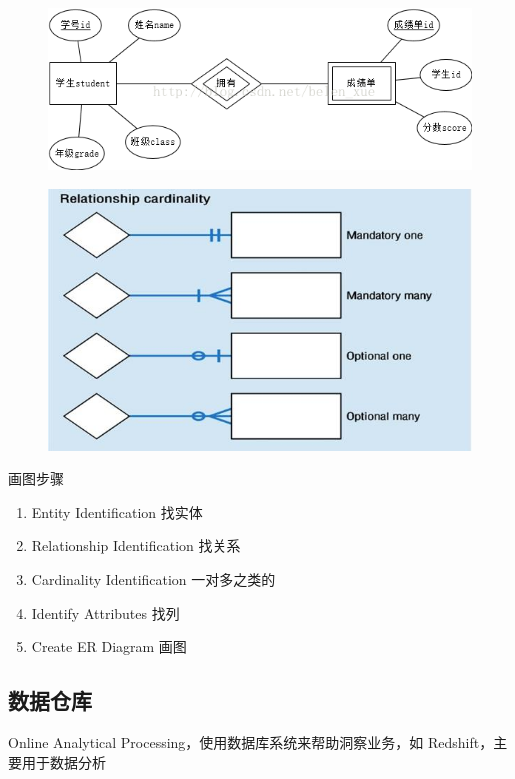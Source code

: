 \documentclass[11pt,journal,compsoc]{IEEEtran}
\begin{document}
\begin{figure}[H]
    \centering
    \includegraphics[width=\linewidth]{ER2.png}
\end{figure}

\begin{figure}[H]
    \centering
    \includegraphics[width=\linewidth]{ER.jpg}
\end{figure}

画图步骤

\begin{enumerate}
    \item Entity Identification 找实体
    \item Relationship Identification 找关系
    \item Cardinality Identification 一对多之类的
    \item Identify Attributes 找列
    \item Create ER Diagram 画图
\end{enumerate}


\subsection{数据仓库}

Online Analytical Processing，使用数据库系统来帮助洞察业务，如 Redshift，主要用于数据分析
\end{document}

